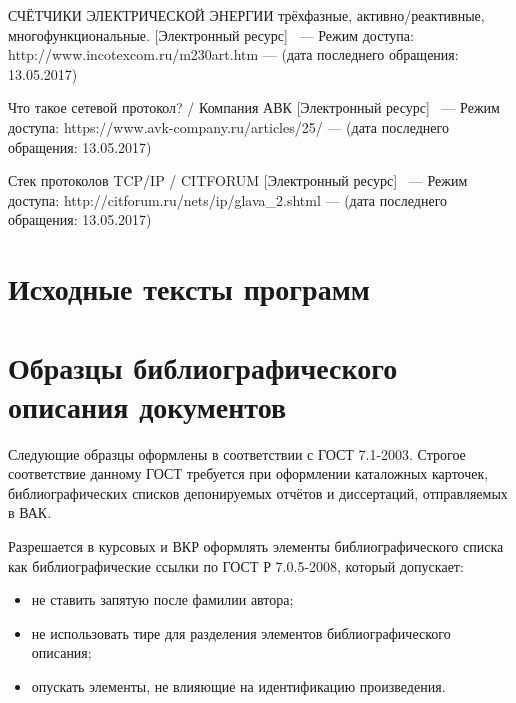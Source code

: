 \documentclass[utf8,14pt, coursreport]{G7-32}
\begin{document}
\begin{thebibliography}{99}
 СЧЁТЧИКИ ЭЛЕКТРИЧЕСКОЙ ЭНЕРГИИ 
трёхфазные, активно/реактивные, многофункциональные. [Электронный ресурс] ~--- Режим доступа: http://www.incotexcom.ru/m230art.htm --- (дата последнего обращения: 13.05.2017)

 Что такое сетевой протокол? / Компания АВК [Электронный ресурс] ~--- Режим доступа: https://www.avk-company.ru/articles/25/ --- (дата последнего обращения: 13.05.2017)

 Стек протоколов TCP/IP / CITFORUM [Электронный ресурс] ~--- Режим доступа: http://citforum.ru/nets/ip/glava\_2.shtml --- (дата последнего обращения: 13.05.2017)

\end{thebibliography}


\appendix

\chapter{Исходные тексты программ}

\iffalse




\chapter{Образцы библиографического описания документов}

Следующие образцы оформлены в соответствии с ГОСТ 7.1-2003. Строгое соответствие данному ГОСТ требуется при оформлении каталожных карточек, библиографических списков депонируемых отчётов и диссертаций, отправляемых в ВАК. 

Разрешается в курсовых и ВКР оформлять элементы библиографического списка как библиографические ссылки по ГОСТ Р 7.0.5-2008, который допускает:
\begin{itemize}
\item не ставить запятую после фамилии автора;
\item не использовать тире для разделения элементов библиографического описания;
\item опускать элементы, не влияющие на идентификацию произведения.
\end{itemize}
\end{document}
